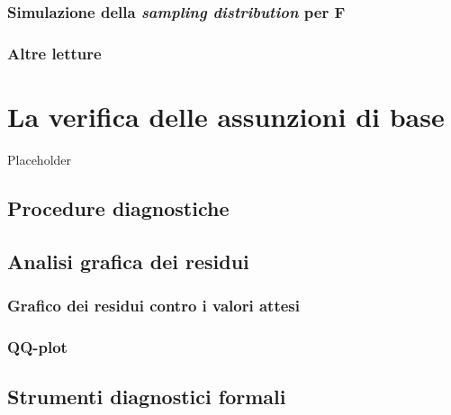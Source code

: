 \documentclass[a4paper,12pt,oneside]{book}
\begin{document}
\hypertarget{simulazione-della-sampling-distribution-per-f}{%
\subsection{\texorpdfstring{Simulazione della \emph{sampling distribution} per F}{Simulazione della sampling distribution per F}}\label{simulazione-della-sampling-distribution-per-f}}

\hypertarget{altre-letture-6}{%
\subsection{Altre letture}\label{altre-letture-6}}

\hypertarget{la-verifica-delle-assunzioni-di-base}{%
\chapter{La verifica delle assunzioni di base}\label{la-verifica-delle-assunzioni-di-base}}

Placeholder

\hypertarget{procedure-diagnostiche}{%
\section{Procedure diagnostiche}\label{procedure-diagnostiche}}

\hypertarget{analisi-grafica-dei-residui}{%
\section{Analisi grafica dei residui}\label{analisi-grafica-dei-residui}}

\hypertarget{grafico-dei-residui-contro-i-valori-attesi}{%
\subsection{Grafico dei residui contro i valori attesi}\label{grafico-dei-residui-contro-i-valori-attesi}}

\hypertarget{qq-plot}{%
\subsection{QQ-plot}\label{qq-plot}}

\hypertarget{strumenti-diagnostici-formali}{%
\section{Strumenti diagnostici formali}\label{strumenti-diagnostici-formali}}
\end{document}
